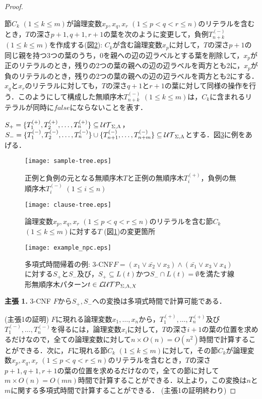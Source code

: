 \begin{proof}
\begin{enumerate}
節$C_k$ $(1\leq k\leq m)$が論理変数$x_p,x_q,x_r$ $(1\leq p < q < r \leq n)$のリテラルを含むとき，$T$の深さ$p+1,q+1,r+1$の葉を次のように変更して，負例$T_{n+k}^{(-)}$ $(1\leq k\leq m)$を作成する(図\ref{fig:clause-tree}): $C_k$が含む論理変数$x_p$に対して，$T$の深さ$p+1$の同じ親を持つ3つの葉のうち，$0$を親への辺の辺ラベルとする葉を削除して，$x_p$が正のリテラルのとき，残りの2つの葉の親への辺の辺ラベルを両方とも$2$に，$x_p$が負のリテラルのとき，残りの2つの葉の親への辺の辺ラベルを両方とも$2$にする．$x_q$と$x_r$のリテラルに対しても，$T$の深さ$q+1$と$r+1$の葉に対して同様の操作を行う．このようにして構成した無順序木$T_{n+k}^{(-)}$ $(1\leq k\leq m)$は，$C_{k}$に含まれるリテラルが同時に$false$にならないことを表す．
\end{enumerate}
$S_{+}=\{T_1^{(+)},T_2^{(+)},\ldots,T_n^{(+)}\}\subseteq {\cal UT}_{\Sigma,\Lambda}$，$S_{-}=\{T_1^{(-)},T_2^{(-)},\ldots,T_{n}^{(-)}\}\cup\{T_{n+1}^{(-)},\ldots,T_{n+m}^{(-)}\}\subseteq {\cal UT}_{\Sigma,\Lambda}$とする．図\ref{fig:example_npc}に例をあげる．

\medskip

\begin{figure}[tb]
  \centering
  \texttt{[image: sample-tree.eps]}
  \caption{正例と負例の元となる無順序木$T$と正例の無順序木$T_{i}^{(+)}$，負例の無順序木$T_{i}^{(-)}$ $(1\leq i\leq n)$}\label{fig:sample-tree}
\end{figure}

\begin{figure}[tb]
  \centering
  \texttt{[image: clause-tree.eps]}
  \caption{論理変数$x_p,x_q,x_r$ $(1\leq p < q < r \leq n)$のリテラルを含む節$C_k$ $(1\leq k\leq m)$に対する$T$ (図\ref{fig:sample-tree})の変更箇所}\label{fig:clause-tree}
\end{figure}

\begin{figure*}[tb]
  \centering
  \texttt{[image: example\_npc.eps]}
  \caption{多項式時間帰着の例: 3-CNF$F=(x_{1}\vee \bar{x_{2}}\vee x_{3})\wedge(\bar{x_{1}}\vee x_{3}\vee x_{4})$に対する$S_{+}$と$S_{-}$及び，$S_+\subseteq L(t)$かつ$S_-\cap L(t)=\emptyset$を満たす線形無順序木パターン$t\in {\cal LUTP}_{\Sigma,\Lambda,X}$}\label{fig:example_npc}
\end{figure*}

\noindent
\textbf{主張 1.}
3-CNF $F$から$S_{+}, S_{-}$への変換は多項式時間で計算可能である．
\smallskip

\noindent
(主張1の証明)
$F$に現れる論理変数$x_{1},\ldots,x_{n}$から，$T_{1}^{(+)},\ldots,T_{n}^{(+)}$及び$T_{1}^{(-)},\ldots,T_{n}^{(-)}$を得るには，論理変数$x_{i}$に対して，$T$の深さ$i+1$の葉の位置を求めるだけなので，全ての論理変数に対して$n\times O(n) = O(n^{2})$時間で計算することができる．次に，$F$に現れる節$C_k$ $(1\leq k\leq m)$に対して，その節$C_k$が論理変数$x_p,x_q,x_r$ $(1\leq p < q < r \leq n)$のリテラルを含むとき，$T$の深さ$p+1, q+1, r+1$の葉の位置を求めるだけなので，全ての節に対して$m\times O(n) = O(mn)$時間で計算することができる．以上より，この変換は$n$と$m$に関する多項式時間で計算することができる．
(主張1の証明終わり)


\end{proof}
